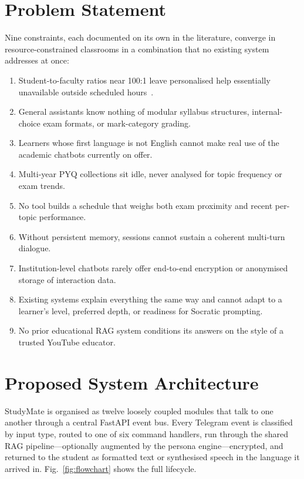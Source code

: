 \documentclass[conference]{IEEEtran}
\begin{document}
\section{Problem Statement}
Nine constraints, each documented on its own in the literature,
converge in resource-constrained classrooms in a combination that no
existing system addresses at once:
\begin{enumerate}
    \item Student-to-faculty ratios near 100:1 leave personalised help
          essentially unavailable outside scheduled hours~\cite{lauber2025}.
    \item General assistants know nothing of modular syllabus
          structures, internal-choice exam formats, or mark-category
          grading.
    \item Learners whose first language is not English cannot make
          real use of the academic chatbots currently on offer.
    \item Multi-year PYQ collections sit idle, never analysed for topic
          frequency or exam trends.
    \item No tool builds a schedule that weighs both exam proximity and
          recent per-topic performance.
    \item Without persistent memory, sessions cannot sustain a coherent
          multi-turn dialogue.
    \item Institution-level chatbots rarely offer end-to-end encryption
          or anonymised storage of interaction data.
    \item Existing systems explain everything the same way and cannot
          adapt to a learner's level, preferred depth, or readiness for
          Socratic prompting.
    \item No prior educational RAG system conditions its answers on the
          style of a trusted YouTube educator.
\end{enumerate}
\section{Proposed System Architecture}
StudyMate is organised as twelve loosely coupled modules that talk to
one another through a central FastAPI event bus. Every Telegram event
is classified by input type, routed to one of six command handlers,
run through the shared RAG pipeline---optionally augmented by the
persona engine---encrypted, and returned to the student as formatted
text or synthesised speech in the language it arrived in.
Fig.~\ref{fig:flowchart} shows the full lifecycle.
\end{document}
